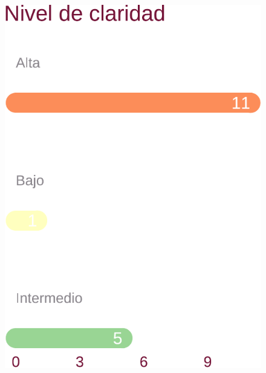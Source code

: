 \documentclass[10,a4paperpaper,]{article}
\begin{document}
\begin{figure}[!htb]
  \begin{minipage}{0.3\textwidth}
    \centering

\includegraphics[width=\textwidth]{ReportEncuestaElectoral_files/figure-latex/unnamed-chunk-1-1} 
  \end{minipage}\hfill
  \begin{minipage}{0.3\textwidth}
    \centering

\end{minipage}
\end{figure}
\end{document}
